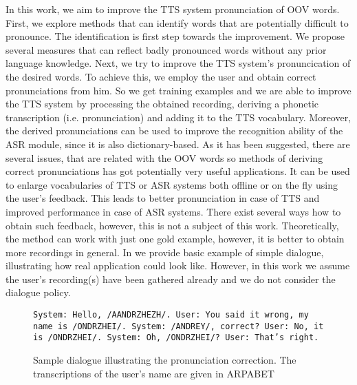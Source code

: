 \linebreak\linebreak
In this work, we aim to improve the TTS system pronunciation of OOV words.
First, we explore methods that can identify words that are potentially difficult to pronounce.
The identification is first step towards the improvement.
We propose several measures that can reflect badly pronounced words without any prior language knowledge.
\linebreak\linebreak
Next, we try to improve the TTS system's pronuncication of the desired words.
To achieve this, we employ the user and obtain correct pronunciations from him.
So we get training examples and we are able to improve the TTS system by processing the obtained recording, deriving a phonetic transcription (i.e. pronunciation) and adding it to the TTS vocabulary.
Moreover, the derived pronunciations can be used to improve the recognition ability of the ASR module, since it is also dictionary-based.
\linebreak\linebreak
As it has been suggested, there are several issues, that are related with the OOV words so methods of deriving correct pronunciations has got potentially very useful applications.
It can be used to enlarge vocabularies of TTS or ASR systems both offline or on the fly using the user's feedback.
This leads to better pronunciation in case of TTS and improved performance in case of ASR systems.
There exist several ways how to obtain such feedback, however, this is not a subject of this work.
Theoretically, the method can work with just one gold example, however, it is better to obtain more recordings in general.
In  we provide basic example of simple dialogue, illustrating how real application could look like.
However, in this work we assume the user's recording(s) have been gathered already and we do not consider the dialogue policy.
\begin{center}
\begin{figure}[h]
\texttt{System: Hello, /AANDRZHEZH/.\linebreak
User: You said it wrong, my name is /ONDRZHEI/.\linebreak
System: /ANDREY/, correct?\linebreak
User: No, it is /ONDRZHEI/.\linebreak
System: Oh, /ONDRZHEI/?\linebreak
User: That's right.
}
\caption{Sample dialogue illustrating the pronunciation correction. The transcriptions of the user's name are given in ARPABET\citep{Arpabet}}
\label{dialogsample}
\end{figure}
\end{center}
